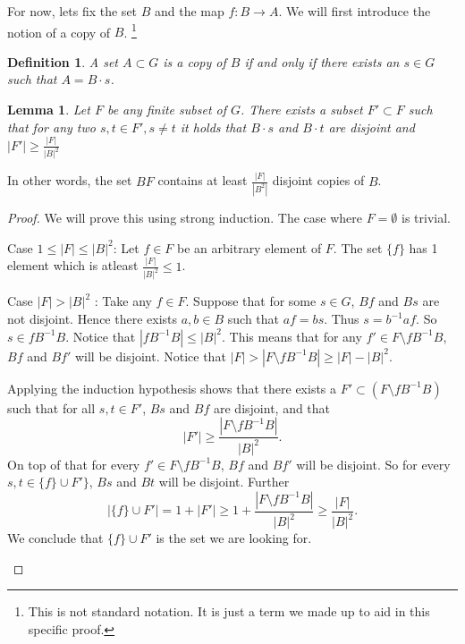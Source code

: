 \documentclass[titlepage, a4paper]{article}
\newcommand{\card}[1]{\left| #1 \right|}
\newtheorem{definition}[theorem]{Definition}
\newtheorem{lemma}[theorem]{Lemma}
\theoremstyle{remark}
\begin{document}
For now, lets fix the set $B$ and the map $f:B \to A$. 
We will first introduce the notion of a copy of $B$. \footnote{This is not standard notation. It is just a term we made up to aid in this specific proof.}
 \begin{definition}
	A set  $A \subset  G$ is a copy of $B$ if and only if there exists an $s \in G$ such that $A = B\cdot s$.
\end{definition}


\begin{lemma}\label{lem:copies_of_B}
	Let $F$ be any finite subset of $G$. There exists a subset $F' \subset F$ such that for any two  $s,t \in F', s\ne t$ it holds that $B\cdot s$ and  $B\cdot t$ are disjoint and $\card{F'} \ge \frac{\card{F}}{\card{B}^2} $
\end{lemma}
In other words, the set  $BF$ contains at least $\frac{\card{F}}{\card{B^2}}$ disjoint copies of $B$.

\begin{proof}
	 We will prove this using strong induction. The case where $F = \emptyset$ is trivial. 
	\begin{description}
		\item{Case $1 \le \card F \le \card{B}^2$:} 
		Let  $f \in F$ be an arbitrary element of $F$. 
		The set $\{f\} $ has 1 element which is atleast $\frac{\card F}{\card B^2} \le 1$.
	\item{Case $\card F > \card{B}^2$ :}
		Take any  $f \in F$. Suppose that for some  $s \in G$,  $Bf$ and  $Bs$ are not disjoint. 
		Hence there exists $a,b \in B$ such that $af = bs$. 
		Thus $s = b^{-1}af$. So $s \in fB^{-1}B$. Notice that $\card{fB^{-1}B}\le \card{B}^2$.
		This means that for any $f' \in F \setminus fB^{-1}B$, $Bf$ and $Bf'$ will be disjoint. 
		Notice that $\card F > \card{F \setminus f B^{-1}B} \ge \card F - \card{B}^2 $.

		Applying the induction hypothesis shows that there exists a $F'\subset  \left( F\setminus fB^{-1}B \right) $ such that  for all  $s, t \in F'$, $Bs$ and $Bf$ are disjoint, 
		and that \[\card {F'}  \ge \frac{\card{F \setminus fB^{-1}B }}{\card{B}^2}.\]
		On top of that for every $f' \in F\setminus fB^{-1}B$, $Bf$ and  $Bf'$ will be disjoint. 
		So for every  $ s, t \in \{ f\} \cup F'\} $,  $Bs$ and $Bt$ will be disjoint.
		Further \[
			\card{\{f\} \cup F'}  = 1 + \card{F' } \ge 1 + \frac{\card{F \setminus fB^{-1}B}}{\card B^2} \ge \frac{\card{F}}{\card{B}^2}
		.\] 
		We conclude that $\{f\} \cup  F'$ is the set we are looking for. 
	\end{description}
\end{proof}
\end{document}
